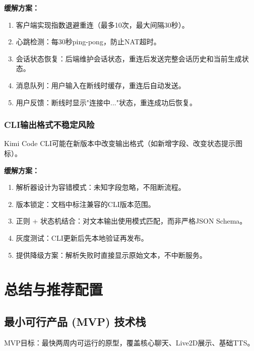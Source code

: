 \documentclass[fontset=mac,a4paper,11pt]{ctexart}
\begin{document}
\textbf{缓解方案：}
\begin{enumerate}[leftmargin=2em]
\item 客户端实现指数退避重连（最多10次，最大间隔30秒）。
\item 心跳检测：每30秒ping-pong，防止NAT超时。
\item 会话状态恢复：后端维护会话状态，重连后发送完整会话历史和当前生成状态。
\item 消息队列：用户输入在断线时缓存，重连后自动发送。
\item 用户反馈：断线时显示"连接中..."状态，重连成功后恢复。
\end{enumerate}

\subsubsection{CLI输出格式不稳定风险}

Kimi Code CLI可能在新版本中改变输出格式（如新增字段、改变状态提示图标）。

\textbf{缓解方案：}
\begin{enumerate}[leftmargin=2em]
\item 解析器设计为容错模式：未知字段忽略，不阻断流程。
\item 版本锁定：文档中标注兼容的CLI版本范围。
\item 正则 + 状态机结合：对文本输出使用模式匹配，而非严格JSON Schema。
\item 灰度测试：CLI更新后先本地验证再发布。
\item 提供降级方案：解析失败时直接显示原始文本，不中断服务。
\end{enumerate}

\section{总结与推荐配置}

\subsection{最小可行产品 (MVP) 技术栈}

MVP目标：最快两周内可运行的原型，覆盖核心聊天、Live2D展示、基础TTS。
\end{document}
